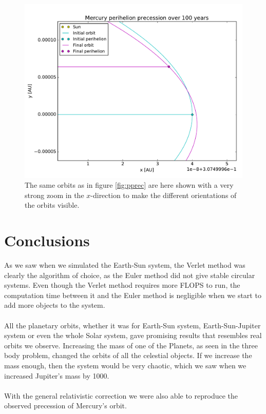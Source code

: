 \documentclass{article}
\begin{document}
\begin{figure}[!h]
    \centering
    \includegraphics[width=\linewidth]{perihelion_precession_2.pdf}
    \caption{The same orbits as in figure \ref{fig:pprec} are here shown with a very strong zoom in the $x$-direction to make the different orientations of the orbits visible.}
    \label{fig:pprec2}
\end{figure}

\FloatBarrier
\section{Conclusions} \label{section:conc}
As we saw when we simulated the Earth-Sun system, the Verlet method was clearly the algorithm of choice, as the Euler method did not give stable circular systems. Even though the Verlet method requires more FLOPS to run, the computation time between it and the Euler method is negligible when we start to add more objects to the system. \\\\
All the planetary orbits, whether it was for Earth-Sun system, Earth-Sun-Jupiter system or even the whole Solar system, gave promising results that resembles real orbits we observe. Increasing the mass of one of the Planets, as seen in the three body problem, changed the orbits of all the celestial objects. If we increase the mass enough, then the system would be very chaotic, which we saw when we increased Jupiter's mass by 1000. \\\\
With the general relativistic correction we were also able to reproduce the observed precession of Mercury's orbit.
\end{document}
